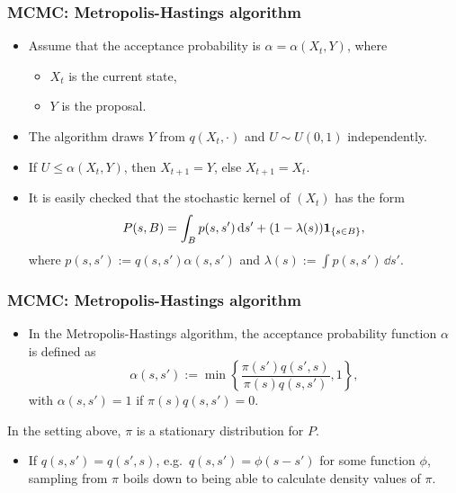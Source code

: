 \documentclass[xcolor=table,10pt]{beamer}
\begin{document}
\begin{frame}
  \frametitle{MCMC: Metropolis-Hastings algorithm} 
  \begin{itemize}
\item Assume that the acceptance probability is $\alpha =
\alpha(X_t,Y)$, where
\begin{itemize}
\item $X_t$ is the current state,
  \item $Y$ is the proposal.
\end{itemize}
\item The algorithm draws $Y$ from $q(X_t,\cdot)$ and $U\sim
U(0,1)$ independently.
\item  If $U\leq \alpha(X_t,Y)$, then $X_{t+1}=Y$,
else $X_{t+1}=X_t$.
\item 
It is easily checked that the stochastic kernel of $(X_t)$ has the
form 
\begin{equation*}
  P(s,B) = \int_B p(s,s')\, {\rm d} s' + (1-\lambda(s)) \mathbf{1}_{\{s\in B\}},
\end{equation*}
where $p(s,s') := q(s,s') \alpha (s,s')$ and $\lambda(s) := \int
p(s,s')\, \dd s'$.
\end{itemize}
\end{frame}

\begin{frame}
  \frametitle{MCMC: Metropolis-Hastings algorithm} 
  \begin{itemize}
\item
In the Metropolis-Hastings algorithm, the acceptance probability
function $\alpha$ is defined as
\begin{equation*}
  \alpha(s,s') := \min\left\{\frac{\pi(s') q(s',s)} {\pi(s) q(s,s')},
  1\right\},
\end{equation*}
with $\alpha(s,s')=1$ if $\pi(s) q(s,s')=0$.
\end{itemize}
\begin{theorem}
  In the setting above, $\pi$ is a stationary distribution for $P$. 
\end{theorem}
\begin{itemize}
\item If $q(s,s')=q(s',s)$, e.g.\ $q(s,s') = \phi(s-s')$ for some
  function $\phi$, sampling from 
$\pi$ boils down to being able to calculate density values of
$\pi$.
\end{itemize}
\end{frame}
\end{document}
